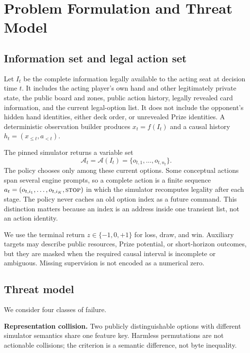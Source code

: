 \section{Problem Formulation and Threat Model}

\subsection{Information set and legal action set}

Let $I_t$ be the complete information legally available to the acting seat at
decision time $t$. It includes the acting player's own hand and other
legitimately private state, the public board and zones, public action history,
legally revealed card information, and the current legal-option list. It does
not include the opponent's hidden hand identities, either deck order, or
unrevealed Prize identities. A deterministic observation builder produces
$x_t=f(I_t)$ and a causal history $h_t=(x_{\leq t},a_{<t})$.

The pinned simulator returns a variable set
\begin{equation}
  \mathcal{A}_t = \mathcal{A}(I_t)=\{o_{t,1},\ldots,o_{t,n_t}\}.
\end{equation}
The policy chooses only among these current options. Some conceptual actions
span several engine prompts, so a complete action is a finite sequence
$a_t=(o_{t,i_1},\ldots,o_{t,i_K},\textsc{stop})$ in which the simulator
recomputes legality after each stage. The policy never caches an old option
index as a future command. This distinction matters because an index is an
address inside one transient list, not an action identity.

We use the terminal return $z\in\{-1,0,+1\}$ for loss, draw, and win. Auxiliary
targets may describe public resources, Prize potential, or short-horizon
outcomes, but they are masked when the required causal interval is incomplete
or ambiguous. Missing supervision is not encoded as a numerical zero.

\subsection{Threat model}

We consider four classes of failure.

\textbf{Representation collision.} Two publicly distinguishable options with
different simulator semantics share one feature key. Harmless permutations are
not actionable collisions; the criterion is a semantic difference, not byte
inequality.


